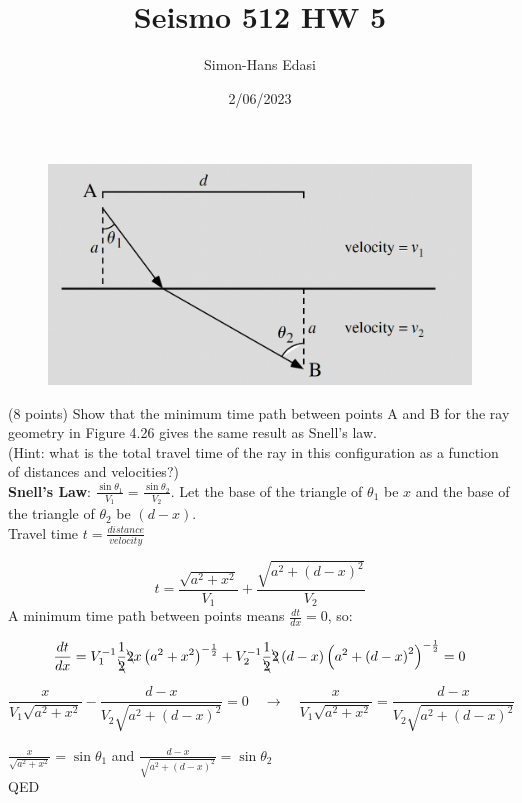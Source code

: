 \documentclass{article}
\title{Seismo 512 HW 5}
\date{2/06/2023}
\author{Simon-Hans Edasi}
\begin{document}
	\maketitle

\section{}

\begin{figure}[H]
    \includegraphics[scale = 0.17]{snell__exercise_4.3.png}
\end{figure}
(8 points) Show that the minimum time path between points A and B for the ray geometry in Figure 4.26 gives the same result as Snell’s law.\\
(Hint: what is the total travel time of the ray in this configuration as a function of distances and velocities?)\\

\textbf{Snell's Law}: $\frac{\sin{\theta_{1}}} {V_{1}} = \frac{\sin{\theta_{2}}}{V_{2}}$. Let the base of the triangle of $\theta_{1}$ be $x$ and the base of the triangle of $\theta_{2}$ be $(d-x)$.\\

Travel time $t = \frac{distance}{velocity}$ 


\[
t = \frac{\sqrt{a^{2}+x^{2}}}{V_{1}} + \frac{\sqrt{a^{2}+\left(d-x\right)^{2}}}{V_{2}}
\]
A minimum time path between points means $\frac{dt}{dx} = 0$, so:

\[
\frac{dt}{dx} = V_{1}^{-1} \frac{1}{\bcancel{2}}\bcancel{2}x\left(a^{2} + x^{2}\right)^{-\frac{1}{2}} + V_{2}^{-1}\frac{1}{\bcancel{2}}\bcancel{2}\left(d-x\right)\left(a^{2} + \left(d-x\right)^{2}\right)^{-\frac{1}{2}} = 0
\]

\[
\frac{x}{V_{1}\sqrt{a^{2}+x^{2}}} - \frac{d-x}{V_{2}\sqrt{a^{2}+\left(d-x\right)^2}} = 0 \quad\rightarrow\quad \frac{x}{V_{1}\sqrt{a^{2}+x^{2}}} = \frac{d-x}{V_{2}\sqrt{a^{2}+\left(d-x\right)^2}}
\]

$\frac{x}{\sqrt{a^{2}+x^{2}}} = \sin{\theta_{1}}$ and $\frac{d-x}{\sqrt{a^{2}+\left(d-x\right)^2}} = \sin{\theta_{2}}$\\

QED 
\end{document}
